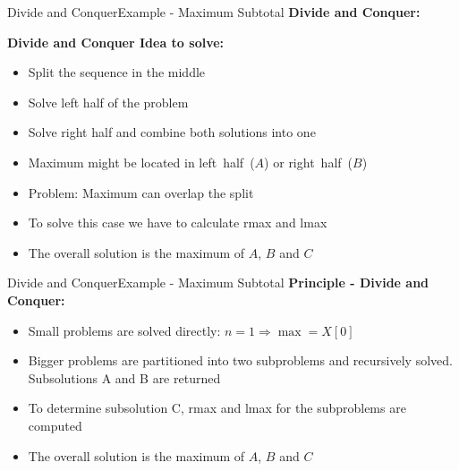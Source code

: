 \begin{frame}{Divide and Conquer}{Example - Maximum Subtotal}
  \textbf{Divide and Conquer:}
  \vspace{-1.5em}
  \begin{figure}
    \begin{adjustbox}{width=\linewidth}
      
    \end{adjustbox}
    \label{fig:divide_and_conquer:max_sub_total_divide}
  \end{figure}
   \vspace{-1.5em}
\textbf{Divide and Conquer Idea to solve:}
  \begin{itemize}
  \item<1->
    Split the sequence in the middle
  \item<2->
    Solve left half of the problem
  \item<3->
    Solve right half and combine both solutions into one
  \item<4->
    Maximum might be located in {\color{MainA}left~half~($A$)}
    or {\color{MainA}right~half~($B$)}
  \item<5->
    Problem: Maximum can {\color{MainA} overlap the split}
  \item<6->
    To solve this case we have to calculate {\color{MainA}rmax}
    and {\color{MainA}lmax}
  \item<7->
    The overall solution is the {\color{MainA}maximum of $A$, $B$ and $C$}
  \end{itemize}
\end{frame}


\begin{frame}{Divide and Conquer}{Example - Maximum Subtotal}
  \textbf{Principle - Divide and Conquer:}
  \begin{itemize}
    \item<2->
      Small problems are solved directly:
      {\color{MainA}$n = 1 \Rightarrow \max = X[0]$}
    \item<3->
      Bigger problems are partitioned into two subproblems
      and recursively solved.
      Subsolutions {\color{MainA}A} and {\color{MainA}B} are returned
    \item<4->
      To determine subsolution {\color{MainA}C}, {\color{MainA}rmax}
      and {\color{MainA}lmax} for the subproblems are computed
    \item<5->
      The overall solution is the {\color{MainA}maximum of $A$, $B$ and $C$}
  \end{itemize}
\end{frame}

